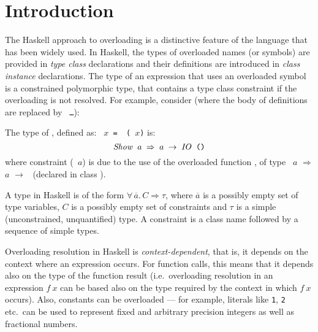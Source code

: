 \section{Introduction}
\label{sec:intro}

The Haskell approach to overloading
\cite{ghc-users-guide,MarkJones94a} is a distinctive feature of the
language that has been widely used. In Haskell, the types of
overloaded names (or symbols) are provided in {\em type class\/}
declarations and their definitions are introduced in {\em class
  instance\/} declarations. The type of an expression that uses an
overloaded symbol is a constrained polymorphic type, that contains a
type class constraint if the overloading is not resolved. For example,
consider (where the body of definitions are replaced by {\tt
  \ldots}):

The type of \print, defined as: \texttt{\print\ $x$ =
  \putStrLn\ (\sshow\ $x$)} is: \[ \texttt{{\it Show\/}\ $a$ $\Rightarrow$
  $a$ $\rightarrow$ {\it IO\/}\ ()} \] where constraint
(\texttt{\SShow\ $a$}) is due to the use of the overloaded function
\sshow, of type \SShow\ $a$ $\Rightarrow$ $a$ $\rightarrow$
\String\ (declared in class \SShow).

A type in Haskell is of the form $\forall\,\overline{a}.\,C
\Rightarrow \tau$, where $\overline{a}$ is a possibly empty set of
type variables, $C$ is a possibly empty set of constraints and $\tau$
is a simple (unconstrained, unquantified) type. A constraint is a
class name followed by a sequence of simple types.

Overloading resolution in Haskell is {\em context-dependent}, that is,
it depends on the context where an expression occurs. For function
calls, this means that it depends also on the type of the function
result (i.e.~overloading resolution in an expression $f\:x$ can be
based also on the type required by the context in which $f\:x$
occurs). Also, constants can be overloaded --- for example, literals
like {\tt 1}, {\tt 2} etc.~can be used to represent fixed and
arbitrary precision integers as well as fractional numbers.

